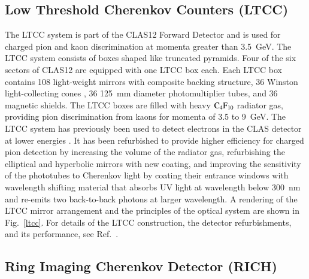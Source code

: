 \documentclass[final,3p,twocolumn]{elsarticle}
\begin{document}
\subsection{Low Threshold Cherenkov Counters (LTCC)}

The LTCC system is part of the CLAS12  Forward Detector and is used for charged pion and kaon discrimination at
momenta greater than 3.5~GeV. The LTCC system consists of boxes shaped like truncated pyramids. Four of the six
sectors of CLAS12 are equipped with one LTCC box each. Each LTCC box contains 108 light-weight mirrors with composite
backing structure, 36 Winston light-collecting cones , 36 125~mm diameter photomultiplier tubes, and 36 magnetic shields.
The LTCC boxes are filled with heavy $\rm C_4F_{10}$ radiator gas, providing pion discrimination from kaons for momenta
of 3.5 to 9~GeV.  The LTCC system has previously been used to detect electrons in the CLAS detector at lower energies
\cite{Adams:2001kk}. It has been refurbished to provide higher efficiency for charged pion detection by increasing the
volume of the radiator gas, refurbishing the elliptical and hyperbolic mirrors with new coating, and improving the sensitivity
of the phototubes to Cherenkov light by coating their entrance windows with wavelength shifting material that absorbs UV
light at wavelength below 300~nm and re-emits two back-to-back photons at larger wavelength. A rendering of the LTCC
mirror arrangement and the principles of the optical system are shown in Fig.~\ref{ltcc}.  For details of the LTCC
construction, the detector refurbishments, and its performance, see Ref.~\cite{LTCC}.   

\subsection{Ring Imaging Cherenkov Detector (RICH)} 
\end{document}
